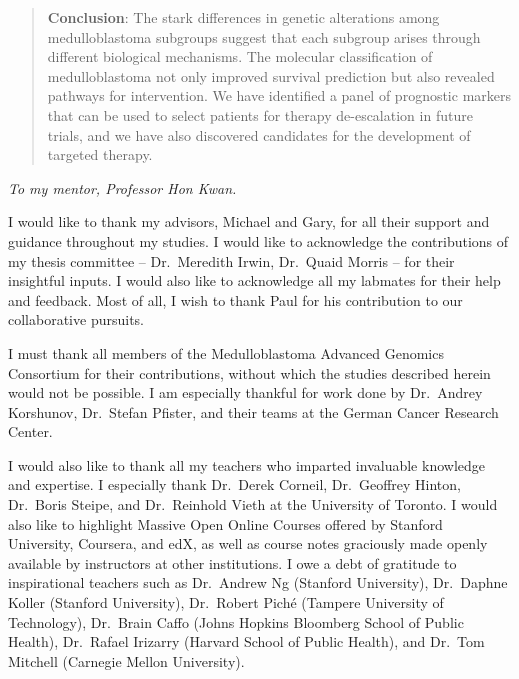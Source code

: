 \documentclass[12pt]{ut-thesis}
\begin{document}
\begin{preliminary}
\begin{abstract}
\textbf{Conclusion}: The stark differences in genetic alterations among medulloblastoma subgroups suggest that each subgroup arises through different biological mechanisms. The molecular classification of medulloblastoma not only improved survival prediction but also revealed pathways for intervention. We have identified a panel of prognostic markers that can be used to select patients for therapy de-escalation in future trials, and we have also discovered candidates for the development of targeted therapy.
\end{abstract}

\cleardoublepage

\begin{dedication}
\begin{center}
\vspace{1in}
\emph{To my mentor, Professor Hon Kwan.}
\end{center}
\end{dedication}

\newpage

\begin{acknowledgements}
I would like to thank my advisors, Michael and Gary, for all their support and guidance throughout my studies. I would like to acknowledge the contributions of my thesis committee -- Dr.\ Meredith Irwin, Dr.\ Quaid Morris -- for their insightful inputs. I would also like to acknowledge all my labmates for their help and feedback. Most of all, I wish to thank Paul for his contribution to our collaborative pursuits.

I must thank all members of the Medulloblastoma Advanced Genomics Consortium for their contributions, without which the studies described herein would not be possible. I am especially thankful for work done by Dr.\ Andrey Korshunov, Dr.\ Stefan Pfister, and their teams at the German Cancer Research Center.

I would also like to thank all my teachers who imparted invaluable knowledge and expertise. I especially thank Dr.\ Derek Corneil, Dr.\ Geoffrey Hinton, Dr.\ Boris Steipe, and Dr.\ Reinhold Vieth at the University of Toronto. I would also like to highlight Massive Open Online Courses offered by Stanford University, Coursera, and edX, as well as course notes graciously made openly available by instructors at other institutions. I owe a debt of gratitude to inspirational teachers such as Dr.\ Andrew Ng (Stanford University), Dr.\ Daphne Koller (Stanford University), Dr.\ Robert Pich\'{e} (Tampere University of Technology), Dr.\ Brain Caffo (Johns Hopkins Bloomberg School of Public Health), Dr.\ Rafael Irizarry (Harvard School of Public Health), and Dr.\ Tom Mitchell (Carnegie Mellon University).


\end{acknowledgements}
\end{preliminary}
\end{document}
